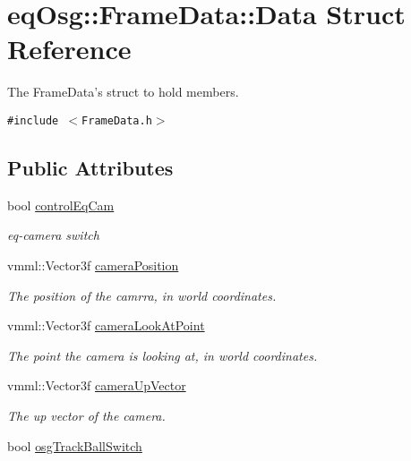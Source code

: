 \hypertarget{a00008}{
\section{eqOsg::FrameData::Data Struct Reference}
\label{a00008}
}
The FrameData's struct to hold members.  


{\tt \#include $<$FrameData.h$>$}

\subsection*{Public Attributes}
\begin{CompactItemize}
\item 
\hypertarget{a00008_a3cfc1223feb27c15704fc3147e97918}{
bool \hyperlink{a00008_a3cfc1223feb27c15704fc3147e97918}{controlEqCam}}
\label{a00008_a3cfc1223feb27c15704fc3147e97918}

\begin{CompactList}\small\item\em eq-camera switch \item\end{CompactList}\item 
\hypertarget{a00008_3d7e162b15c8002297eae09a51d20cb8}{
vmml::Vector3f \hyperlink{a00008_3d7e162b15c8002297eae09a51d20cb8}{cameraPosition}}
\label{a00008_3d7e162b15c8002297eae09a51d20cb8}

\begin{CompactList}\small\item\em The position of the camrra, in world coordinates. \item\end{CompactList}\item 
\hypertarget{a00008_5ddb1c00dd8d5537474e33e234d7b96e}{
vmml::Vector3f \hyperlink{a00008_5ddb1c00dd8d5537474e33e234d7b96e}{cameraLookAtPoint}}
\label{a00008_5ddb1c00dd8d5537474e33e234d7b96e}

\begin{CompactList}\small\item\em The point the camera is looking at, in world coordinates. \item\end{CompactList}\item 
\hypertarget{a00008_720f59f063b8a1ab581918361987ffd4}{
vmml::Vector3f \hyperlink{a00008_720f59f063b8a1ab581918361987ffd4}{cameraUpVector}}
\label{a00008_720f59f063b8a1ab581918361987ffd4}

\begin{CompactList}\small\item\em The up vector of the camera. \item\end{CompactList}\item 
\hypertarget{a00008_53f26b3187a95b3f28be5eaaf7595a1d}{
bool \hyperlink{a00008_53f26b3187a95b3f28be5eaaf7595a1d}{osgTrackBallSwitch}}
\label{a00008_53f26b3187a95b3f28be5eaaf7595a1d}


\end{CompactItemize}
